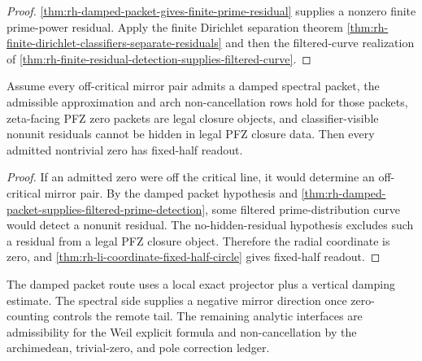 \begin{proof}
\autoref{thm:rh-damped-packet-gives-finite-prime-residual} supplies a
nonzero finite prime-power residual.  Apply the finite Dirichlet
separation theorem
\autoref{thm:rh-finite-dirichlet-classifiers-separate-residuals} and
then the filtered-curve realization of
\autoref{thm:rh-finite-residual-detection-supplies-filtered-curve}.
\end{proof}

\begin{theorem}
\label{thm:rh-damped-packet-route-conditional-fixed-half-readout}
Assume every off-critical mirror pair admits a damped spectral packet,
the admissible approximation and arch non-cancellation rows hold for
those packets, zeta-facing PFZ zero packets are legal closure objects,
and classifier-visible nonunit residuals cannot be hidden in legal
PFZ closure data.  Then every admitted nontrivial zero has fixed-half
readout.
\end{theorem}

\begin{proof}
If an admitted zero were off the critical line, it would determine an
off-critical mirror pair.  By the damped packet hypothesis and
\autoref{thm:rh-damped-packet-supplies-filtered-prime-detection}, some
filtered prime-distribution curve would detect a nonunit residual.  The
no-hidden-residual hypothesis excludes such a residual from a legal PFZ
closure object.  Therefore the radial coordinate is zero, and
\autoref{thm:rh-li-coordinate-fixed-half-circle} gives fixed-half
readout.
\end{proof}

\begin{principle}
\label{prin:rh-damped-packet-audit-boundary}
The damped packet route uses a local exact projector plus a vertical
damping estimate.  The spectral side supplies a negative mirror
direction once zero-counting controls the remote tail.  The remaining
analytic interfaces are admissibility for the Weil explicit formula and
non-cancellation by the archimedean, trivial-zero, and pole correction
ledger.
\end{principle}
